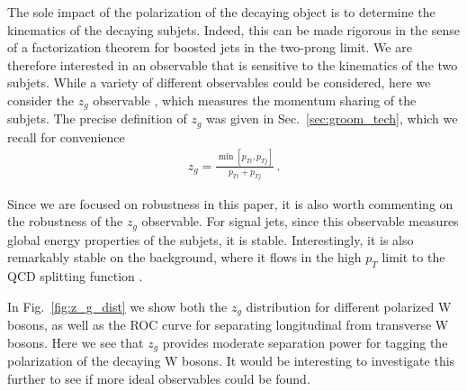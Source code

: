 \documentclass[11pt,letterpaper]{article}
\DeclareRobustCommand{\Sec}[1]{Sec.~\ref{#1}}
\DeclareRobustCommand{\Fig}[1]{Fig.~\ref{#1}}
\begin{document}
The sole impact of the polarization of the decaying object is to determine the kinematics of the decaying subjets.
%
Indeed, this can be made rigorous in the sense of a factorization theorem for boosted jets in the two-prong limit.
%
We are therefore interested in an observable that is sensitive to the kinematics of the two subjets.
%
While a variety of different observables could be considered, here we consider the $z_g$ observable \cite{Larkoski:2014wba,Larkoski:2014bia,Larkoski:2015lea}, which measures the momentum sharing of the subjets. The precise definition of $z_g$ was given in \Sec{sec:groom_tech}, which we recall for convenience
\begin{align}
z_g=\frac{\min\left[ p_{Ti}, p_{Tj}  \right]}{p_{Ti}+p_{Tj}}\,.
\end{align}

Since we are focused on robustness in this paper, it is also worth commenting on the robustness of the $z_g$ observable. For signal jets, since this observable measures global energy properties of the subjets, it is stable.
%
Interestingly, it is also remarkably stable on the background, where it flows in the high $p_T$ limit to the QCD splitting function \cite{Larkoski:2014wba,Larkoski:2014bia,Larkoski:2015lea}.


In \Fig{fig:z_g_dist} we show both the $z_g$ distribution for different polarized W bosons, as well as the ROC curve for separating longitudinal from transverse W bosons. Here we see that $z_g$ provides moderate separation power for tagging the polarization of the decaying W bosons. It would be interesting to investigate this further to see if more ideal observables could be found.
\end{document}
